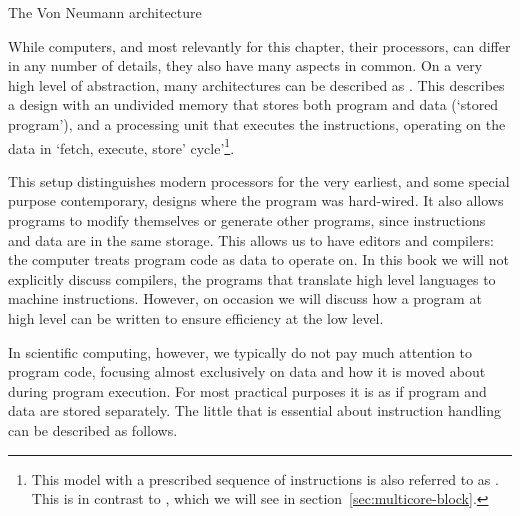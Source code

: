  {The Von Neumann architecture}
\label{sec:vonneuman}

While computers, and most relevantly for this chapter, their
processors, can differ in any number of details, they also have many
aspects in common. On a very high level of abstraction, many
architectures can be described as . This describes a design with an undivided memory
that stores both program and data (`stored program'), and a processing
unit that executes the instructions, operating on the data in `fetch,
execute, store' cycle'\footnote{This model with a prescribed sequence
  of instructions is also referred to as . This is in contrast to , which we will
  see in section~\ref{sec:multicore-block}.}.

This setup distinguishes modern processors for the very earliest, and
some special purpose contemporary, designs where the program was
hard-wired. It also allows programs to modify themselves or generate
other programs, since
instructions and data are in the same storage. This allows us to have
editors and compilers: the computer treats program code as data to
operate on. In this book we will not explicitly discuss compilers, the
programs that translate high level languages to machine
instructions. However, on occasion we will discuss how a program at
high level can be written to ensure efficiency at the low level.

In scientific computing, however, we typically do not pay much
attention to program code, focusing almost exclusively on data and how
it is moved about during program execution.  For most practical
purposes it is as if program and data are stored separately. The
little that is essential about instruction handling can be described
as follows.

